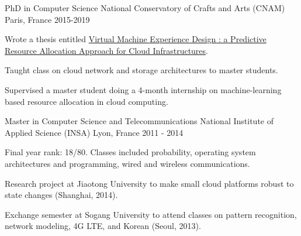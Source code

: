 
\begin{cventries}

  \cventry
  {PhD in Computer Science}
  {National Conservatory of Crafts and Arts (CNAM)} %
  {Paris, France} %
    {2015-2019} %
    {
      \begin{cvitems} %
      \item{Wrote a thesis entitled \href{http://www.theses.fr/2019CNAM1246}{Virtual Machine Experience Design : a Predictive Resource Allocation Approach for Cloud Infrastructures}}. 
      \item {Taught class on cloud network and storage architectures to master students.}
      \item {Supervised a master student doing a 4-month internship on machine-learning based resource allocation in cloud computing.}
      \end{cvitems}
    }
  
  \cventry
    {Master in Computer Science and Telecommunications} %
    {National Institute of Applied Science (INSA)} %
    {Lyon, France} %
    {2011 - 2014} %
    {
      \begin{cvitems} %
      \item {Final year rank: 18/80. Classes included probability, operating system architectures and programming, wired and wireless communications.}
      \item {Research project at Jiaotong University to make small cloud platforms robust to state changes (Shanghai, 2014).}
      \item {Exchange semester at Sogang University to attend classes on pattern recognition, network modeling, 4G LTE, and Korean (Seoul, 2013).}
      \end{cvitems}
    }

\end{cventries}
